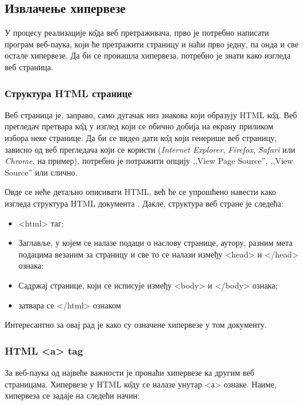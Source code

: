 \subsection{Извлачење хипервезе}

У процесу реализације к\^{о}да веб претраживача, прво је потребно написати
програм веб-паука, који ће претражити страницу и наћи прво једну, па онда и све остале хипервезе. Да би се пронашла хипервеза, потребно је знати како изгледа веб страница.

\subsubsection{Структура HTML странице}

Веб страница
је, заправо, само дугачак низ знакова који образују HTML к\^{о}д. Веб прегледач претвара к\^{о}д у изглед који се обично добија на екрану приликом избора неке странице. Да би се видео дати к\^{о}д који генерише веб страницу,  зависно од веб прегледача који се користи (\emph{Internet Explorer}, \emph{Firefox}, \emph{Safari} или \emph{Chrome}, на пример), потребно је потражити опцију ,,View Page Source'', ,,View Source'' или слично.

Овде се неће детаљно описивати HTML, већ ће се упрошћено
навести како изгледа структура HTML документа \cite{strukturaHTML}. Дакле, структура веб стране је следећа:

\begin{itemize}
\item <html> таг;
\item Заглавље, у којем се налазе подаци о наслову странице, аутору, разним  мета подацима везаним за страницу и све то се налази између <head> и </head> ознака;
\item Садржај странице, који се исписује између <body> и </body> ознака;
\item затвара се </html> ознаком
\end{itemize}

Интересантно за овај рад је како су означене хипервезе у том документу.

\subsubsection{HTML <a> tag}
За веб-паука од највеће важности је пронаћи хипервезе ка другим  веб страницама. Хипервезе у HTML к\^{о}ду се налазе унутар <а> ознаке. Наиме, хипервеза се задаје на следећи начин:

